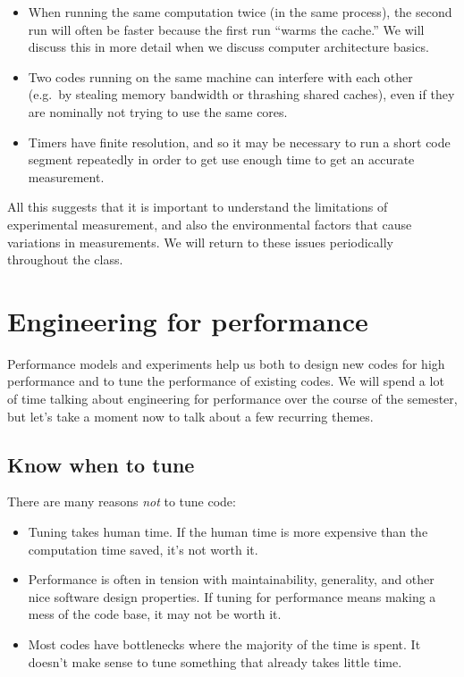 \documentclass[12pt, leqno]{article} %
\begin{document}
\begin{itemize}
\item
  When running the same computation twice (in the same process), the
  second run will often be faster because the first run ``warms the
  cache.'' We will discuss this in more detail when we discuss computer
  architecture basics.
\item
  Two codes running on the same machine can interfere with each other
  (e.g.~by stealing memory bandwidth or thrashing shared caches), even
  if they are nominally not trying to use the same cores.
\item
  Timers have finite resolution, and so it may be necessary to run a
  short code segment repeatedly in order to get use enough time to get
  an accurate measurement.
\end{itemize}

All this suggests that it is important to understand the limitations of
experimental measurement, and also the environmental factors that cause
variations in measurements. We will return to these issues periodically
throughout the class.

\section{Engineering for performance}

Performance models and experiments help us both to design new codes for
high performance and to tune the performance of existing codes. We will
spend a lot of time talking about engineering for performance over the
course of the semester, but let's take a moment now to talk about a few
recurring themes.

\subsection{Know when to tune}

There are many reasons \emph{not} to tune code:

\begin{itemize}
\item
  Tuning takes human time. If the human time is more expensive than the
  computation time saved, it's not worth it.
\item
  Performance is often in tension with maintainability, generality, and
  other nice software design properties. If tuning for performance means
  making a mess of the code base, it may not be worth it.
\item
  Most codes have bottlenecks where the majority of the time is spent.
  It doesn't make sense to tune something that already takes little
  time.
\end{itemize}
\end{document}
